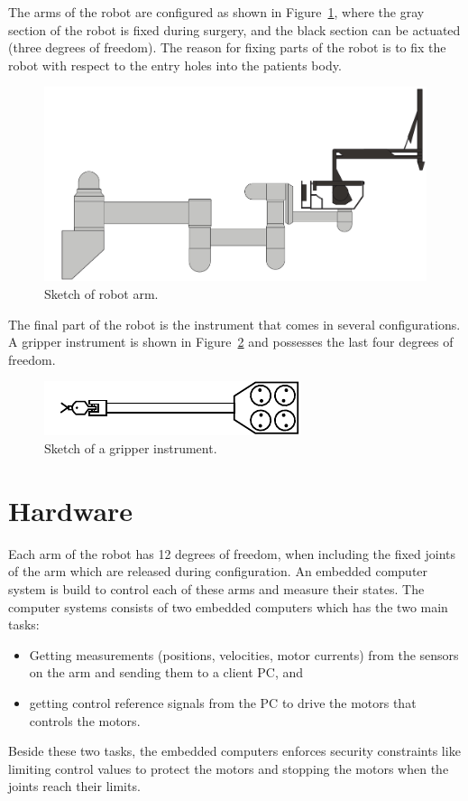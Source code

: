 \documentclass[a4paper, 11 pt, conference]{IEEEtran}  %
\begin{document}
The arms of the robot are configured as shown in Figure~\ref{fig:p4-conceptual}, where the gray section of the robot is fixed during surgery, and the black section can be actuated (three degrees of freedom). The reason for fixing parts of the robot is to fix the robot with respect to the entry holes into the patients body.

\begin{figure}
    \centering
       \includegraphics[width=\linewidth]{p4-conceptual.pdf}
    \caption{Sketch of robot arm. \label{fig:p4-conceptual}}
\end{figure}

The final part of the robot is the instrument that comes in several configurations. A gripper instrument is shown in Figure~\ref{fig:gripper} and possesses the last four degrees of freedom.

\begin{figure}
    \centering
       \includegraphics[width=0.8\linewidth]{endeffector.pdf}
    \caption{Sketch of a gripper instrument. \label{fig:gripper}}
\end{figure}

\section{Hardware}\label{sec:hardware}
Each arm of the robot has 12 degrees of freedom, when including the fixed joints of the arm which are released during configuration.
An embedded computer system is build to control each of these arms and measure their states.
The computer systems consists of two embedded computers which has the two main tasks:
\begin{itemize}
\item Getting measurements (positions, velocities, motor currents) from the sensors on the arm and sending them to a client PC, and
\item getting control reference signals from the PC to drive the motors that controls the motors.
\end{itemize}
Beside these two tasks, the embedded computers enforces security constraints like limiting control values to protect the motors and stopping the motors when the joints reach their limits.
\end{document}
